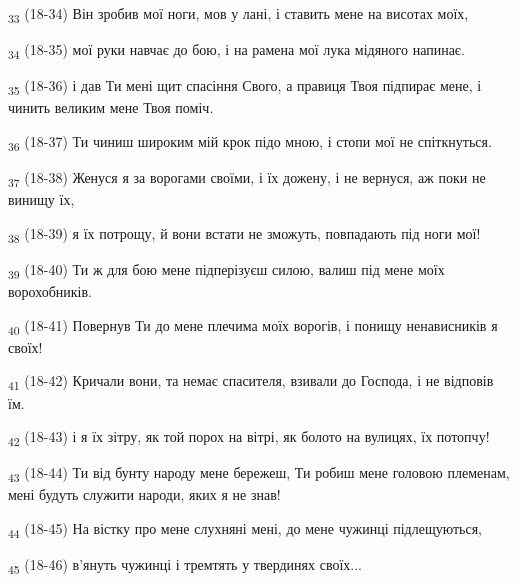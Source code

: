 \begin{tcolorbox}
\textsubscript{33} (18-34) Він зробив мої ноги, мов у лані, і ставить мене на висотах моїх,
\end{tcolorbox}
\begin{tcolorbox}
\textsubscript{34} (18-35) мої руки навчає до бою, і на рамена мої лука мідяного напинає.
\end{tcolorbox}
\begin{tcolorbox}
\textsubscript{35} (18-36) і дав Ти мені щит спасіння Свого, а правиця Твоя підпирає мене, і чинить великим мене Твоя поміч.
\end{tcolorbox}
\begin{tcolorbox}
\textsubscript{36} (18-37) Ти чиниш широким мій крок підо мною, і стопи мої не спіткнуться.
\end{tcolorbox}
\begin{tcolorbox}
\textsubscript{37} (18-38) Женуся я за ворогами своїми, і їх дожену, і не вернуся, аж поки не винищу їх,
\end{tcolorbox}
\begin{tcolorbox}
\textsubscript{38} (18-39) я їх потрощу, й вони встати не зможуть, повпадають під ноги мої!
\end{tcolorbox}
\begin{tcolorbox}
\textsubscript{39} (18-40) Ти ж для бою мене підперізуєш силою, валиш під мене моїх ворохобників.
\end{tcolorbox}
\begin{tcolorbox}
\textsubscript{40} (18-41) Повернув Ти до мене плечима моїх ворогів, і понищу ненависників я своїх!
\end{tcolorbox}
\begin{tcolorbox}
\textsubscript{41} (18-42) Кричали вони, та немає спасителя, взивали до Господа, і не відповів їм.
\end{tcolorbox}
\begin{tcolorbox}
\textsubscript{42} (18-43) і я їх зітру, як той порох на вітрі, як болото на вулицях, їх потопчу!
\end{tcolorbox}
\begin{tcolorbox}
\textsubscript{43} (18-44) Ти від бунту народу мене бережеш, Ти робиш мене головою племенам, мені будуть служити народи, яких я не знав!
\end{tcolorbox}
\begin{tcolorbox}
\textsubscript{44} (18-45) На вістку про мене слухняні мені, до мене чужинці підлещуються,
\end{tcolorbox}
\begin{tcolorbox}
\textsubscript{45} (18-46) в'януть чужинці і тремтять у твердинях своїх...
\end{tcolorbox}
